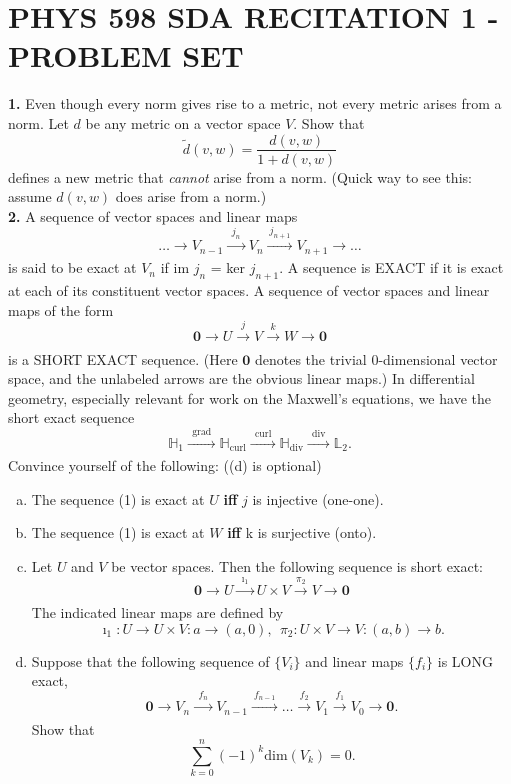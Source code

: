 \documentclass[aps,prl,groupedaddress,amsmath,amssymb,nofootinbib,12pt]{revtex4-1}
\begin{document}
\section{PHYS 598 SDA RECITATION 1 - PROBLEM SET}

\textbf{1.} Even though every norm gives rise to a metric, not every metric arises from a norm. Let $d$ be any metric on a vector space $V$. Show that 
\[\widetilde d(v, w) = \frac{d(v, w)}{1 + d(v, w)}\]
defines a new metric that \emph{cannot} arise from a norm. (Quick way to see this: assume $d(v,w)$ does arise from a norm.)\\

\textbf{2.} A sequence of vector spaces and linear maps 
\[\ldots \xrightarrow[]{~~~~~}  V_{n-1} \xrightarrow[]{~~j_n~~} V_n \xrightarrow[]{~j_{n+1}~} V_{n+1}\xrightarrow[]{~~~~~} \ldots\]
is said to be exact at $V_n$ if im $j_n$ = ker $j_{n+1}$. A sequence is EXACT if it is exact at each
of its constituent vector spaces. A sequence of vector spaces and linear maps of the form
\begin{equation}
\bm{0} \xrightarrow[]{~~~~~}  U \xrightarrow[]{~~j~~} V \xrightarrow[]{~k~} W\xrightarrow[]{~~~~~} \bm{0}
\end{equation}
is a SHORT EXACT sequence. (Here $\bm{0}$ denotes the trivial 0-dimensional vector space, and
the unlabeled arrows are the obvious linear maps.) In differential geometry, especially relevant for work on the Maxwell's equations, we have the short exact sequence
\[\mathbb{H}_1 \xrightarrow[]{~~\text{grad}~~}\mathbb{H}_\text{curl}\xrightarrow[]{~~\text{curl}~~}\mathbb{H}_\text{div}\xrightarrow[]{~~\text{div}~~}\mathbb{L}_2.\]
Convince yourself of the following: ((d) is optional)
\begin{enumerate}[(a)]
\item
The sequence (1) is exact at $U$ \textbf{iff} $j$ is injective (one-one).
\vspace{-3 mm}

\item
The sequence (1) is exact at $W$ \textbf{iff} k is surjective (onto).
\vspace{-3 mm}

\item
Let $U$ and $V$ be vector spaces. Then the following sequence is short exact:
\[\bm{0} \xrightarrow[]{~~~~~}  U \xrightarrow[]{~~\imath_1~~} U\times V \xrightarrow[]{~\pi_2~} V\xrightarrow[]{~~~~~} \bm{0}\]
The indicated linear maps are defined by
\[\imath_1 : U \to U \times V : a \to (a,0), ~~ \pi_2 : U\times V \to V : (a,b) \to b.\]
\item
Suppose that the following sequence of $\{V_i\}$ and linear maps $\{f_i\}$ is LONG exact,
\[\bm{0} \xrightarrow[]{~~~~~}  V_{n} \xrightarrow[]{~~f_{n}~~} V_{n-1} \xrightarrow[]{~f_{n-1}~} \ldots \xrightarrow[]{~f_{2}~}V_{1}\xrightarrow[]{~f_{1}~}V_{0}\xrightarrow[]{~~~~~} \bm{0}.\]
Show that
\[\sum_{k=0}^n (-1)^k \text{dim}(V_k) = 0.\]
\end{enumerate}
\end{document}
